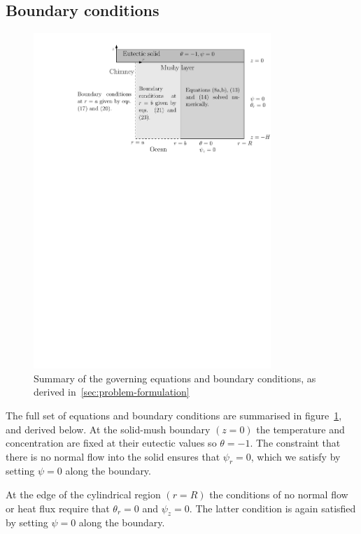 \documentclass[11pt]{proc}
\begin{document}
\subsection{Boundary conditions}
\begin{figure}[ht!]
    \centering
       \includegraphics[width=0.8\textwidth]{boundary-conditions}
       \caption{Summary of the governing equations and boundary conditions, as derived in~\autoref{sec:problem-formulation}}
    \label{fig:boundary-conditions}
\end{figure}


The full set of equations and boundary conditions are summarised in figure~\ref{fig:boundary-conditions}, and derived below. At the solid-mush boundary $(z=0)$ the temperature and concentration are fixed at their eutectic values so $\theta = -1$. The constraint that there is no normal flow into the solid ensures that $\psi_r = 0$, which we satisfy by setting $\psi = 0$ along the boundary.

At the edge of the cylindrical region $(r=R)$ the conditions of no normal flow or heat flux require that $\theta_r=0$ and $\psi_z=0$. The latter condition is again satisfied by setting $\psi = 0$ along the boundary.
\end{document}
